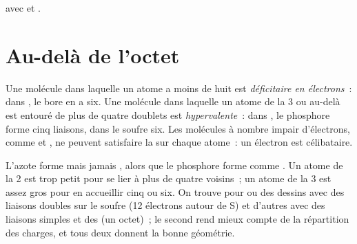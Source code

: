 \begin{omfigure}

{\small {} avec  et .}
\end{omfigure}

\section{Au-delà de l'octet}

\begin{definition}\label{def:b1:lewis-resonance-vsepr:hypervalent}
Une molécule dans laquelle un atome a moins de huit 
est \emph{déficitaire en électrons}~: dans , le bore en a
six. Une molécule dans laquelle un atome de la  3 ou au-delà est
entouré de plus de quatre doublets est \emph{hypervalente}~: dans
, le phosphore forme cinq liaisons, dans  le soufre six.
Les molécules à nombre impair d'électrons, comme  et , ne
peuvent satisfaire la  sur chaque atome~: un électron est
célibataire.
\end{definition}

\begin{remark}\label{rem:b1:lewis-resonance-vsepr:hypervalent}
L'azote forme  mais jamais , alors que le phosphore forme
 comme . Un atome de la  2 est trop petit pour se
lier à plus de quatre voisins~; un atome de la  3 est assez gros
pour en accueillir cinq ou six. On trouve pour  ou
 des dessins avec des liaisons doubles sur le soufre (12
électrons autour de S) et d'autres avec des liaisons simples et des
 (un octet)~; le second rend mieux compte de la
répartition des charges, et tous deux donnent la bonne géométrie.
\end{remark}

